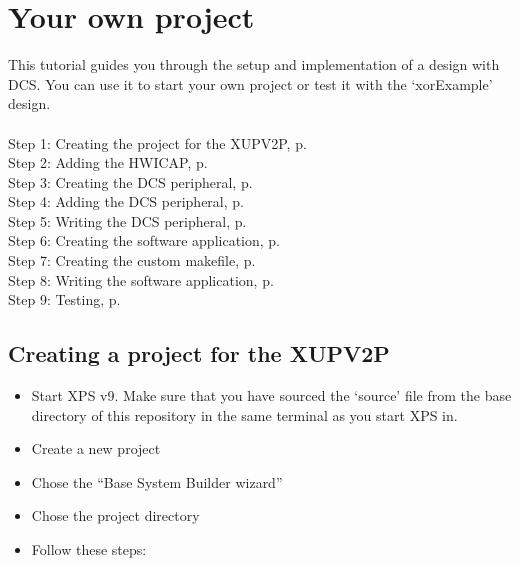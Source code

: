 \documentclass[a4paper,oneside]{memoir}
\begin{document}
\section{Your own project}
This tutorial guides you through the setup and implementation of a design with DCS. You can use it to start your own project or test it with the `xorExample' design.\\
\\
Step 1: Creating the project for the XUPV2P, p.\ \pageref{sec:creating_proj}\\
Step 2: Adding the HWICAP, p.\ \pageref{sec:adding_hwicap}\\
Step 3: Creating the DCS peripheral, p.\ \pageref{sec:creating_peripheral}\\
Step 4: Adding the DCS peripheral, p.\ \pageref{sec:adding_peripheral}\\
Step 5: Writing the DCS peripheral, p.\ \pageref{sec:writing_peripheral}\\
Step 6: Creating the software application, p.\ \pageref{sec:creating_software}\\
Step 7: Creating the custom makefile, p.\ \pageref{sec:creating_makefile}\\
Step 8: Writing the software application, p.\ \pageref{sec:writing_software}\\
Step 9: Testing, p.\ \pageref{sec:testing}



\subsection{Creating a project for the XUPV2P}\label{sec:creating_proj}

\begin{itemize}
\item Start XPS v9. Make sure that you have sourced the `source' file from the base directory of this repository in the same terminal as you start XPS in.
\item    Create a new project
\item    Chose the ``Base System Builder wizard''
\item    Chose the project directory
\item    Follow these steps:
\end{itemize}
\end{document}
